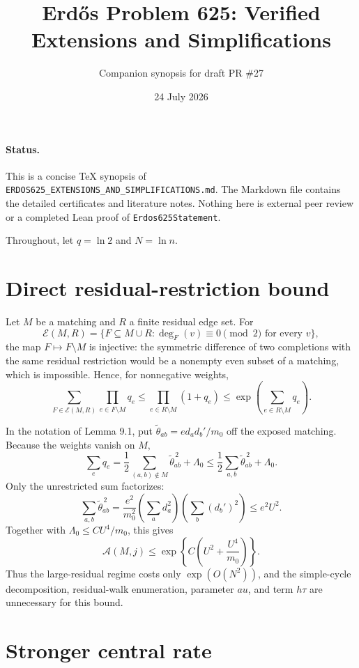 \documentclass[11pt]{article}
\title{Erd\H{o}s Problem 625: Verified Extensions and Simplifications}
\author{Companion synopsis for draft PR \#27}
\date{24 July 2026}
\begin{document}
\maketitle

\paragraph{Status.}
This is a concise TeX synopsis of
\texttt{ERDOS625\_EXTENSIONS\_AND\_SIMPLIFICATIONS.md}.  The Markdown file
contains the detailed certificates and literature notes.  Nothing here is
external peer review or a completed Lean proof of
\texttt{Erdos625Statement}.

Throughout, let \(q=\ln2\) and \(N=\ln n\).

\section{Direct residual-restriction bound}

Let \(M\) be a matching and \(R\) a finite residual edge set.  For
\[
 \mathcal E(M,R)=\{F\subseteq M\cup R:\deg_F(v)\equiv0\pmod2
   \text{ for every }v\},
\]
the map \(F\mapsto F\setminus M\) is injective: the symmetric difference of
two completions with the same residual restriction would be a nonempty even
subset of a matching, which is impossible.  Hence, for nonnegative weights,
\[
 \sum_{F\in\mathcal E(M,R)}\prod_{e\in F\setminus M}q_e
 \le \prod_{e\in R\setminus M}(1+q_e)
 \le \exp\!\left(\sum_{e\in R\setminus M}q_e\right).
 \tag{1.1}
\]

In the notation of Lemma 9.1, put
\(\widetilde\theta_{ab}=e d_ad_b'/m_0\) off the exposed matching.  Because the
weights vanish on \(M\),
\[
 \sum_e q_e
 =\frac12\sum_{(a,b)\notin M}\widetilde\theta_{ab}^{\,2}+\Lambda_0
 \le\frac12\sum_{a,b}\widetilde\theta_{ab}^{\,2}+\Lambda_0.
 \tag{1.2}
\]
Only the unrestricted sum factorizes:
\[
 \sum_{a,b}\widetilde\theta_{ab}^{\,2}
 =\frac{e^2}{m_0^2}
   \left(\sum_a d_a^2\right)\left(\sum_b(d_b')^2\right)
 \le e^2U^2.
 \tag{1.3}
\]
Together with \(\Lambda_0\le CU^4/m_0\), this gives
\[
 \boxed{\mathcal A(M,j)\le
 \exp\!\left\{C\left(U^2+\frac{U^4}{m_0}\right)\right\}.}
 \tag{1.4}
\]
Thus the large-residual regime costs only \(\exp(O(N^2))\), and the
simple-cycle decomposition, residual-walk enumeration, parameter \(	au\), and
term \(h\tau\) are unnecessary for this bound.

\section{Stronger central rate}
\end{document}
